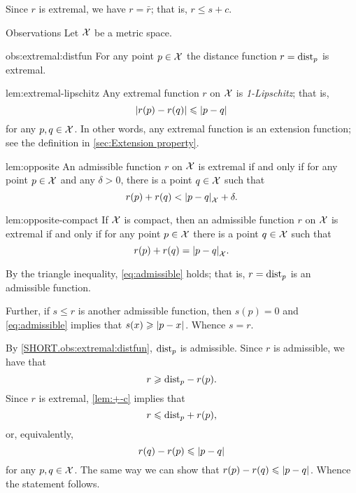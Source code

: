 Since $r$ is extremal, we have $r=\bar r$;
that is, $r\le s+c$.
\qeds

\begin{thm}{Observations}\label{obs:extremal}
Let $\mathcal{X}$ be a metric space.

\begin{subthm}{obs:extremal:distfun}
For any point $p\in\mathcal{X}$
the distance function $r\z=\distfun_p$ is extremal.
\end{subthm}

\begin{subthm}{lem:extremal-lipschitz}
Any extremal function $r$ on $\mathcal{X}$ is \emph{1-Lipschitz};
that is,
\[|r(p)-r(q)|\le \dist{p}{q}{}\]
for any $p,q\in\mathcal{X}$.
In other words, any extremal function is an extension function; see the definition in \ref{sec:Extension property}.
\end{subthm}

\begin{subthm}{lem:opposite}
An admissible function $r$ on $\mathcal{X}$ is extremal if and only if
for any point $p\in\mathcal{X}$ and any $\delta>0$, there is a point $q\in \mathcal{X}$
such that 
\[r(p)+r(q)<\dist{p}{q}{\spc{X}}+\delta.\]
\end{subthm}

\begin{subthm}{lem:opposite-compact}
If $\mathcal{X}$ is compact, then an admissible function $r$ on $\mathcal{X}$ is extremal if and only if
for any point $p\in\mathcal{X}$ there is a point $q\in \mathcal{X}$
such that 
\[r(p)+r(q)=\dist{p}{q}{\spc{X}}.\]
\end{subthm}

\end{thm}

By the triangle inequality, \ref{eq:admissible} holds;
that is, $r=\mathrm{dist}_p$ is an admissible function.

Further, if $s\le r$ is another admissible function, then $s(p)=0$ and \ref{eq:admissible} implies that $s(x)\z\ge\dist{p}{x}{}$.
Whence $s=r$.

By \ref{SHORT.obs:extremal:distfun}, $\mathrm{dist}_p$ is admissible.
Since $r$ is admissible, we have that
\[r\geqslant \mathrm{dist}_p-r(p).\]
Since $r$ is extremal, \ref{lem:+-c} implies that
\[r\leqslant \mathrm{dist}_p+r(p),\]
or, equivalently,
\[r(q)-r(p)\le \dist{p}{q}{}\]
for any $p,q\in\mathcal{X}$.
The same way we can show that
$r(p)-r(q)\le \dist{p}{q}{}$.
Whence the statement follows.


